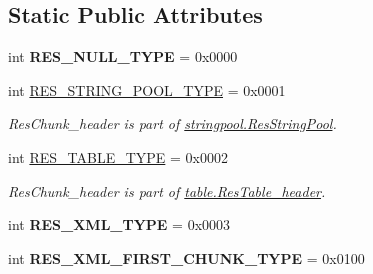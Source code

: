 \subsection*{Static Public Attributes}
\begin{DoxyCompactItemize}
\item 
\mbox{\label{classarsc_1_1types_1_1ResourceType_af1786a9013371730067939e2eb77e530}} 
int {\bfseries R\+E\+S\+\_\+\+N\+U\+L\+L\+\_\+\+T\+Y\+PE} = 0x0000
\item 
\mbox{\label{classarsc_1_1types_1_1ResourceType_afb1b1cbec751d3ba92ee0cb722f8987c}} 
int \mbox{\hyperlink{classarsc_1_1types_1_1ResourceType_afb1b1cbec751d3ba92ee0cb722f8987c}{R\+E\+S\+\_\+\+S\+T\+R\+I\+N\+G\+\_\+\+P\+O\+O\+L\+\_\+\+T\+Y\+PE}} = 0x0001
\begin{DoxyCompactList}\small\item\em Res\+Chunk\+\_\+header is part of \mbox{\hyperlink{classarsc_1_1stringpool_1_1ResStringPool}{stringpool.\+Res\+String\+Pool}}. \end{DoxyCompactList}\item 
\mbox{\label{classarsc_1_1types_1_1ResourceType_aa09309a3e24293829bf8856338eb839a}} 
int \mbox{\hyperlink{classarsc_1_1types_1_1ResourceType_aa09309a3e24293829bf8856338eb839a}{R\+E\+S\+\_\+\+T\+A\+B\+L\+E\+\_\+\+T\+Y\+PE}} = 0x0002
\begin{DoxyCompactList}\small\item\em Res\+Chunk\+\_\+header is part of \mbox{\hyperlink{classarsc_1_1table_1_1ResTable__header}{table.\+Res\+Table\+\_\+header}}. \end{DoxyCompactList}\item 
\mbox{\label{classarsc_1_1types_1_1ResourceType_ae53161d035e110d9dd276b64e64dc008}} 
int {\bfseries R\+E\+S\+\_\+\+X\+M\+L\+\_\+\+T\+Y\+PE} = 0x0003
\item 
\mbox{\label{classarsc_1_1types_1_1ResourceType_a51d4489b5023ea85c6233c74730afc82}} 
int {\bfseries R\+E\+S\+\_\+\+X\+M\+L\+\_\+\+F\+I\+R\+S\+T\+\_\+\+C\+H\+U\+N\+K\+\_\+\+T\+Y\+PE} = 0x0100
\item 
\mbox{\label{classarsc_1_1types_1_1ResourceType_a9043b7e6fcf74bd7369036bbe04a7be1}} 

\end{DoxyCompactItemize}
